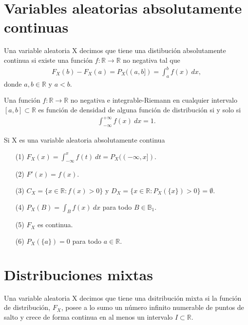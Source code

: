 \section{Variables aleatorias absolutamente continuas}

\begin{defi}
    Una variable aleatoria X decimos que tiene una distibución absolutamente continua si existe una función $f: \mathbb{R} \longrightarrow \mathbb{R}$ no negativa tal que
    \begin{align*}
        F_X(b) - F_X(a) = P_X((a,b]) = \int_{a}^{b}{f(x) \ dx},
    \end{align*}
    donde $a, b \in \mathbb{R}$ y $a < b$.
\end{defi}

\begin{prop}
    Una función $f: \mathbb{R} \longrightarrow \mathbb{R}$ no negativa e integrable-Riemann en cualquier intervalo $[a,b] \subset \mathbb{R}$ es función de densidad de alguna función de distribución si y solo si
    \begin{align*}
        \int_{-\infty}^{+\infty}{f(x) \ dx} = 1.
    \end{align*}
\end{prop}

\begin{obs}
    Si X es una variable aleatoria absolutamente continua
    \begin{enumerate}
        \item[(1)] $F_X(x) = \int_{-\infty}^{x}{f(t) \ dt} = P_X((-\infty,x])$.
        \item[(2)] $F'(x) = f(x)$.
        \item[(3)] $C_X = \{x \in \mathbb{R} : f(x) > 0 \}$ y $D_X = \{x \in \mathbb{R} : P_X(\{x\}) > 0 \} = \emptyset$.
        \item[(4)] $P_X(B) = \int_{B}{f(x) \ dx}$ para todo $B \in \mathbb{B}_1$.
        \item[(5)] $F_X$ es continua.
        \item[(6)] $P_X(\{a\}) = 0$ para todo $a \in \mathbb{R}$.
    \end{enumerate}
\end{obs}

\section{Distribuciones mixtas}

\begin{defi}
    Una variable aleatoria X decimos que tiene una dsitribución mixta si la función de distribución, $F_X$, posee a lo sumo un número infinito numerable de puntos de salto y crece de forma continua en al menos un intervalo $I \subset \mathbb{R}$.
\end{defi}

